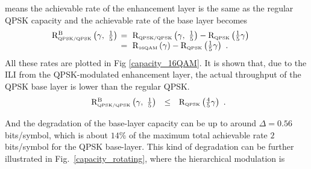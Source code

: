 \documentclass[10pt,fleqn, twocolumn]{IEEEtran}
\begin{document}
means the achievable rate of the enhancement layer is the same as
the regular QPSK capacity and the achievable rate of the base
layer becomes
\begin{equation}\hspace{-0.2in}
\begin{array}{rl}
{\rm R}_{\mbox{\tiny QPSK/QPSK}}^{\rm B}\left(\gamma,\
\frac{1}{5}\right)&\hspace{-0.08in}=\ {\rm R}_{\mbox{\tiny
QPSK/QPSK}}\left(\gamma,\
\frac{1}{5}\right)-{\rm R}_{\mbox{\tiny QPSK}} \left(\frac{1}{5}\gamma\right)\\
&\hspace{-0.08in}=\ {\rm R}_{\mbox{\tiny
16QAM}}\left(\gamma\right)-{\rm R}_{\mbox{\tiny
QPSK}}\left(\frac{1}{5}\gamma\right)\ .
\end{array}\label{R_16QAM_B1}
\end{equation}
\noindent All these rates are plotted in Fig \ref{capacity_16QAM}.
It is shown that, due to the ILI from the QPSK-modulated
enhancement layer, the actual throughput of the QPSK base layer is
lower than the regular QPSK.
\begin{equation}
\begin{array}{rcl}
{\rm R}_{\mbox{\tiny QPSK/QPSK}}^{\rm B}\left(\gamma,\ \frac{1}{5}
\right)&\leq&{\rm R}_{\mbox{\tiny QPSK}}
\left(\frac{4}{5}\gamma\right)
\end{array}.\label{R_16QAM_B2}
\end{equation}
\begin{figure}
\end{figure}
\noindent And the degradation of the base-layer capacity can be up
to around $\Delta=0.56$ bits/symbol, which is about $14\%$ of the
maximum total achievable rate $2$ bits/symbol for the QPSK
base-layer. This kind of degradation can be further illustrated in
Fig.~\ref{capacity_rotating}, where the hierarchical modulation is
\end{document}
